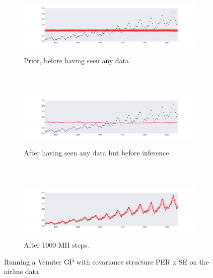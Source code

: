 \documentclass{article} %
\begin{document}
\begin{figure}
        \centering
        \begin{subfigure}[b]{\textwidth} \centering
                \includegraphics[height=3cm]{figs/airline_sexper_1a.png}
                \caption{Prior, before having seen any data.}
                \label{fig:airlineBO}
        \end{subfigure}%
        ~ %
          
        \begin{subfigure}[b]{\textwidth} \centering
                \includegraphics[height=3cm]{figs/airline_sexper_2a.png}
                \caption{After having seen any data but before inference}
                \label{fig:AirlineA))}
        \end{subfigure}
        ~ %
          
        \begin{subfigure}[b]{\textwidth} \centering
                \includegraphics[height=3cm]{figs/airline_sexper_3a.png}
                \caption{After 1000 MH steps.}
                \label{fig:airlineAI}
        \end{subfigure}
        \caption{Running a Venuter GP with covariance structure PER x SE on the airline data}\label{fig:airline}
\end{figure}
\end{document}

